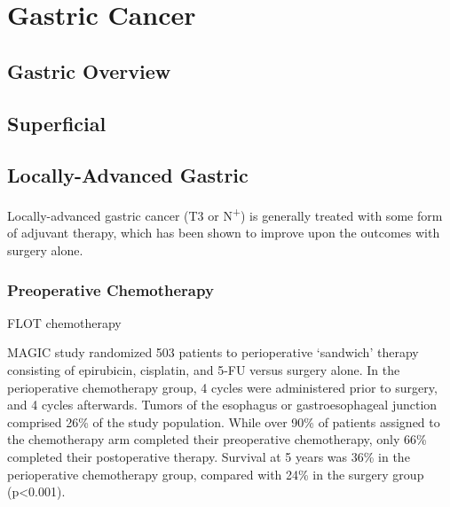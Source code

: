 \documentclass[
]{book}
\begin{document}
\citep{beukema85} \citep{frandsen516} \citep{gharzaie0158916}

\hypertarget{part-gastric-cancer}{%
\part*{Gastric Cancer}\label{part-gastric-cancer}}

\hypertarget{gastric-overview}{%
\chapter{Gastric Overview}\label{gastric-overview}}

\hypertarget{gast_superficial}{%
\chapter{Superficial}\label{gast_superficial}}

\hypertarget{locally-advanced-gastric}{%
\chapter{Locally-Advanced Gastric}\label{locally-advanced-gastric}}

Locally-advanced gastric cancer (T3 or N\textsuperscript{+}) is generally treated with some form of adjuvant therapy, which has been shown to improve upon the outcomes with surgery alone.

\hypertarget{preoperative-chemotherapy}{%
\section{Preoperative Chemotherapy}\label{preoperative-chemotherapy}}

FLOT chemotherapy \citep{al-batran1948}

MAGIC study randomized 503 patients to perioperative `sandwich' therapy consisting of epirubicin, cisplatin, and 5-FU versus surgery alone. In the perioperative chemotherapy group, 4 cycles were administered prior to surgery, and 4 cycles afterwards. Tumors of the esophagus or gastroesophageal junction comprised 26\% of the study population. While over 90\% of patients assigned to the chemotherapy arm completed their preoperative chemotherapy, only 66\% completed their postoperative therapy. Survival at 5 years was 36\% in the perioperative chemotherapy group, compared with 24\% in the surgery group (p\textless0.001).\citep{cunningham11}
\end{document}
